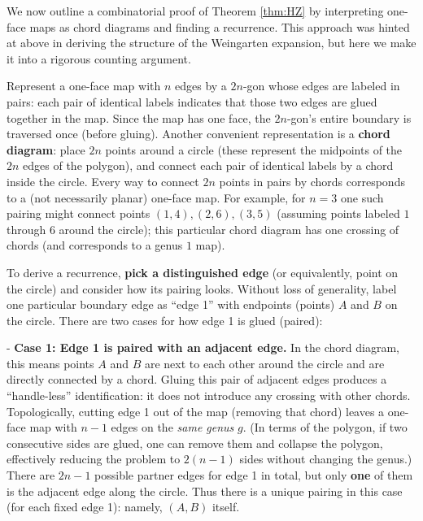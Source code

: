 \documentclass[letterpaper,11pt,oneside,reqno]{article}
\numberwithin{equation}{section}
\theoremstyle{definition}
\begin{document}
We now outline a combinatorial proof of Theorem \ref{thm:HZ} by interpreting one-face maps as chord diagrams and finding a recurrence. This approach was hinted at above in deriving the structure of the Weingarten expansion, but here we make it into a rigorous counting argument.

Represent a one-face map with $n$ edges by a $2n$-gon whose edges are labeled in pairs: each pair of identical labels indicates that those two edges are glued together in the map. Since the map has one face, the $2n$-gon's entire boundary is traversed once (before gluing). Another convenient representation is a \textbf{chord diagram}: place $2n$ points around a circle (these represent the midpoints of the $2n$ edges of the polygon), and connect each pair of identical labels by a chord inside the circle. Every way to connect $2n$ points in pairs by chords corresponds to a (not necessarily planar) one-face map. For example, for $n=3$ one such pairing might connect points $(1,4), (2,6), (3,5)$ (assuming points labeled $1$ through $6$ around the circle); this particular chord diagram has one crossing of chords (and corresponds to a genus $1$ map).

To derive a recurrence, \textbf{pick a distinguished edge} (or equivalently, point on the circle) and consider how its pairing looks. Without loss of generality, label one particular boundary edge as ``edge 1'' with endpoints (points) $A$ and $B$ on the circle. There are two cases for how edge 1 is glued (paired):

- \textbf{Case 1: Edge 1 is paired with an adjacent edge.} In the chord diagram, this means points $A$ and $B$ are next to each other around the circle and are directly connected by a chord. Gluing this pair of adjacent edges produces a ``handle-less'' identification: it does not introduce any crossing with other chords. Topologically, cutting edge 1 out of the map (removing that chord) leaves a one-face map with $n-1$ edges on the \emph{same genus} $g$. (In terms of the polygon, if two consecutive sides are glued, one can remove them and collapse the polygon, effectively reducing the problem to $2(n-1)$ sides without changing the genus.) There are $2n-1$ possible partner edges for edge 1 in total, but only \textbf{one} of them is the adjacent edge along the circle. Thus there is a unique pairing in this case (for each fixed edge 1): namely, $(A,B)$ itself.
\end{document}
